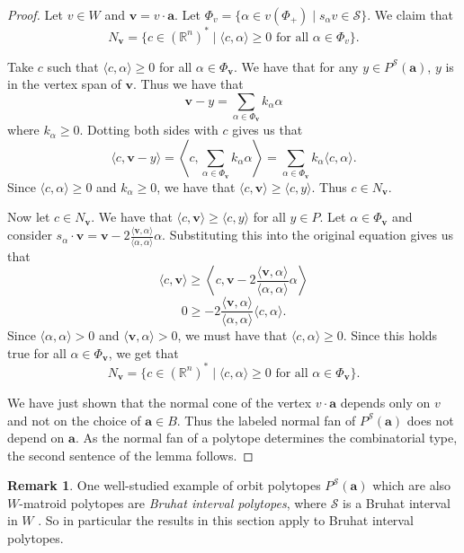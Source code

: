 \documentclass{amsart}
\theoremstyle{definition}
\newtheorem{rmk}[thm]{Remark}
\newcommand{\bR}{\mathbb{R}}
\def\ba{\mathbf{a}}
\def\bv{\mathbf{v}}
\def\cS{\mathcal{S}}
\begin{document}
\begin{proof} 
    Let $v\in W$ and $\bv=v\cdot\ba$. Let $\Phi_v=\{\alpha\in v(\Phi_+) \mid s_\alpha v\in \cS\}$. We claim that 
    \[N_\bv=\{c\in (\bR^n)^\ast\mid \langle c,\alpha\rangle \geq0 \text{ for all }\alpha\in \Phi_v\}.\]

    Take $c$ such that $\langle c,\alpha\rangle\geq 0$ for all $\alpha\in \Phi_\bv$. We have that for any $y\in P^\cS(\ba)$, $y$ is in the vertex span of $\bv$. Thus we have that 
    \[\bv-y=\underset{\alpha\in \Phi_\bv}{\sum}k_\alpha \alpha\]
    where $k_\alpha\geq 0$. Dotting both sides with $c$ gives us that 
    \[\langle c,\bv-y\rangle=\left\langle c,\underset{\alpha\in\Phi_\bv}{\sum}k_\alpha \alpha\right\rangle = \underset{\alpha\in\Phi_\bv}{\sum}k_\alpha \langle c,\alpha\rangle.\]
    Since $\langle c,\alpha\rangle \geq 0$ and $k_\alpha\geq 0$, we have that $\langle c,\bv\rangle\geq \langle c,y\rangle$. Thus $c\in N_\bv$.

    Now let $c\in N_\bv$. We have that $\langle c,\bv\rangle\geq \langle c,y\rangle$ for all $y\in P$. Let $\alpha\in \Phi_\bv$ and consider $s_\alpha\cdot \bv=\bv-2\frac{\langle \bv,\alpha\rangle}{\langle \alpha,\alpha\rangle}\alpha$. Substituting this into the original equation gives us that 
    \[\langle c,\bv\rangle \geq \left\langle c,\bv-2\frac{\langle \bv,\alpha\rangle}{\langle \alpha,\alpha\rangle}\alpha\right\rangle\] \[0\geq -2\frac{\langle \bv,\alpha\rangle}{\langle \alpha,\alpha\rangle}\langle c,\alpha\rangle.\]
    Since $\langle \alpha,\alpha\rangle >0$ and $\langle \bv,\alpha\rangle >0$, we must have that $\langle c,\alpha\rangle \geq 0$. Since this holds true for all $\alpha\in \Phi_\bv$, we get that 
    \[N_\bv=\{c\in (\bR^n)^\ast\mid \langle c,\alpha\rangle \geq0 \text{ for all }\alpha\in \Phi_\bv\}.\]
    
    We have just shown that the normal cone of the vertex $v \cdot \ba$ depends only on $v$ and not on the choice of $\ba\in B$. Thus the labeled normal fan of $P^\cS(\ba)$ does not depend on $\ba$. As the normal fan of a polytope determines the combinatorial type, the second sentence of the lemma follows.
\end{proof}

\begin{rmk}
    One well-studied example of orbit polytopes $P^\cS(\ba)$ which are also $W$-matroid polytopes are \emph{Bruhat interval polytopes}, where $\cS$ is a Bruhat interval in $W$ \cite{TW15}. So in particular the results in this section apply to Bruhat interval polytopes.
\end{rmk}
\end{document}
